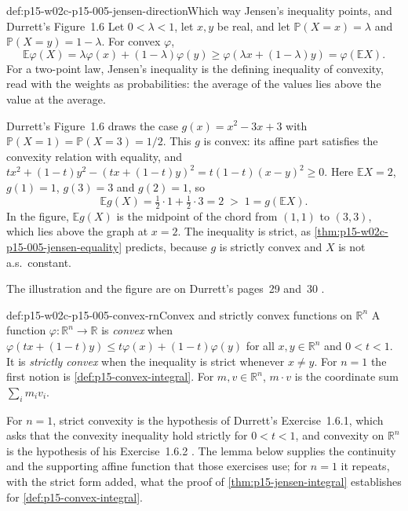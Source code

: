 \begin{hbexample}{def:p15-w02c-p15-005-jensen-direction}{Which way Jensen's inequality points, and Durrett's Figure~1.6}
Let \(0<\lambda<1\), let \(x,y\) be real, and let
\(\mathbb P(X=x)=\lambda\) and \(\mathbb P(X=y)=1-\lambda\). For
convex \(\varphi\),
\[
 \mathbb E\varphi(X)=\lambda\varphi(x)+(1-\lambda)\varphi(y)
 \geq\varphi(\lambda x+(1-\lambda)y)=\varphi(\mathbb EX).
\]
For a two-point law, Jensen's inequality is the defining inequality of
convexity, read with the weights as probabilities: the average of the
values lies above the value at the average.

Durrett's Figure~1.6 draws the case \(g(x)=x^2-3x+3\) with
\(\mathbb P(X=1)=\mathbb P(X=3)=1/2\). This \(g\) is convex: its
affine part satisfies the convexity relation with equality, and
\(tx^2+(1-t)y^2-(tx+(1-t)y)^2=t(1-t)(x-y)^2\geq0\). Here
\(\mathbb EX=2\), \(g(1)=1\), \(g(3)=3\) and \(g(2)=1\), so
\[
 \mathbb Eg(X)=\tfrac12\cdot1+\tfrac12\cdot3=2
 \;>\;1=g(\mathbb EX).
\]
In the figure, \(\mathbb Eg(X)\) is the midpoint of the chord from
\((1,1)\) to \((3,3)\), which lies above the graph at \(x=2\). The
inequality is strict, as \cref{thm:p15-w02c-p15-005-jensen-equality}
predicts, because \(g\) is strictly convex and \(X\) is not a.s.\ constant.
\end{hbexample}

The illustration and the figure are on Durrett's pages~29
and~30 \cite[pp.~29--30]{DurrettPTEAuthor2019}.

\begin{hbdefinition}{def:p15-w02c-p15-005-convex-rn}{Convex and strictly convex functions on \(\mathbb R^n\)}
A function \(\varphi:\mathbb R^n\to\mathbb R\) is \emph{convex} when
\(\varphi(tx+(1-t)y)\leq t\varphi(x)+(1-t)\varphi(y)\) for all
\(x,y\in\mathbb R^n\) and \(0<t<1\). It is \emph{strictly convex}
when the inequality is strict whenever \(x\neq y\). For \(n=1\) the
first notion is \cref{def:p15-convex-integral}. For
\(m,v\in\mathbb R^n\), \(m\cdot v\) is the coordinate sum
\(\sum_im_iv_i\).
\end{hbdefinition}

For \(n=1\), strict convexity is the hypothesis of Durrett's
Exercise~1.6.1, which asks that the convexity inequality hold strictly
for \(0<t<1\), and convexity on \(\mathbb R^n\) is the hypothesis of
his Exercise~1.6.2 \cite[p.~35]{DurrettPTEAuthor2019}. The lemma below
supplies the continuity and the supporting affine function that those
exercises use; for \(n=1\) it repeats, with the strict form added, what
the proof of \cref{thm:p15-jensen-integral} establishes for
\cref{def:p15-convex-integral}.

